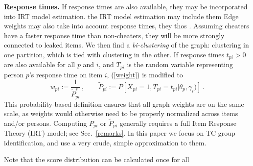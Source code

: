 \documentclass{article}
\begin{document}
\begin{itemize}
{\bf Response times.}
If response times are also available, they may be incorporated into IRT model estimation.
the IRT model estimation may include them 
Edge weights may also take into account response times, they thos
. Assuming cheaters have a faster response time than non-cheaters, they will be more strongly connected to leaked items. We then find a {\it bi-clustering} of the graph: clustering in one partition, which is tied with clustering in the other.
If response times $t_{pi} > 0$ are also available for all $p$ and $i$, and $T_{pi}$ is the random variable representing person $p$'s response time on item $i$, (\ref{weight}) is modified to
\begin{equation}
  w_{pi} := \frac{1}{\tilde{P}_{pi}^{s}}\,,\qquad \tilde{P}_{pi} := P \left[X_{pi}=1, T_{pi}=t_{pi} | \theta_p, \gamma_i) \right]\,.
\end{equation}
This probability-based definition ensures that all graph weights are on the same scale, as weights would otherwise need to be properly normalized across items and/or persons. Computing $P_{pi}$ or $\tilde{P}_{pi}$ generally requires a full Item Response Theory (IRT) model; see Sec.~\ref{remarks}. In this paper we focus on TC group identification, and use a very crude, simple approximation to them.

Note that the score distribution can be calculated once for all 

\end{itemize}



\end{document}
